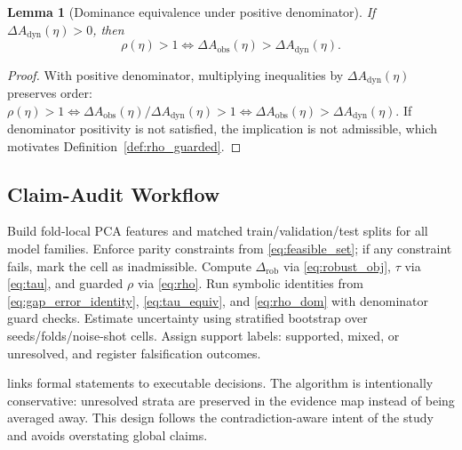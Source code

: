 \documentclass{article} %
\newtheorem{lemma}[theorem]{Lemma}
\begin{document}
\begin{lemma}[Dominance equivalence under positive denominator]
\label{lem:rho_dom}
If $\Delta A_{\mathrm{dyn}}(\eta)>0$, then
\begin{equation}
\label{eq:rho_dom}
\rho(\eta)>1 \iff \Delta A_{\mathrm{obs}}(\eta)>\Delta A_{\mathrm{dyn}}(\eta).
\end{equation}
\end{lemma}
\begin{proof}
With positive denominator, multiplying inequalities by $\Delta A_{\mathrm{dyn}}(\eta)$ preserves order:
\(\rho(\eta)>1\iff \Delta A_{\mathrm{obs}}(\eta)/\Delta A_{\mathrm{dyn}}(\eta)>1\iff \Delta A_{\mathrm{obs}}(\eta)>\Delta A_{\mathrm{dyn}}(\eta)\).
If denominator positivity is not satisfied, the implication is not admissible, which motivates Definition~\ref{def:rho_guarded}.
\end{proof}

\subsection{Claim-Audit Workflow}
\begin{algorithm}[t]
\caption{Parity-Locked Claim Audit Workflow}
\label{alg:audit}
\begin{algorithmic}[1]
\STATE Build fold-local PCA features and matched train/validation/test splits for all model families.
\STATE Enforce parity constraints from \eqref{eq:feasible_set}; if any constraint fails, mark the cell as inadmissible.
\STATE Compute $\Delta_{\mathrm{rob}}$ via \eqref{eq:robust_obj}, $\tau$ via \eqref{eq:tau}, and guarded $\rho$ via \eqref{eq:rho}.
\STATE Run symbolic identities from \eqref{eq:gap_error_identity}, \eqref{eq:tau_equiv}, and \eqref{eq:rho_dom} with denominator guard checks.
\STATE Estimate uncertainty using stratified bootstrap over seeds/folds/noise-shot cells.
\STATE Assign support labels: supported, mixed, or unresolved, and register falsification outcomes.
\end{algorithmic}
\end{algorithm}

 links formal statements to executable decisions. The algorithm is intentionally conservative: unresolved strata are preserved in the evidence map instead of being averaged away. This design follows the contradiction-aware intent of the study and avoids overstating global claims.
\end{document}
